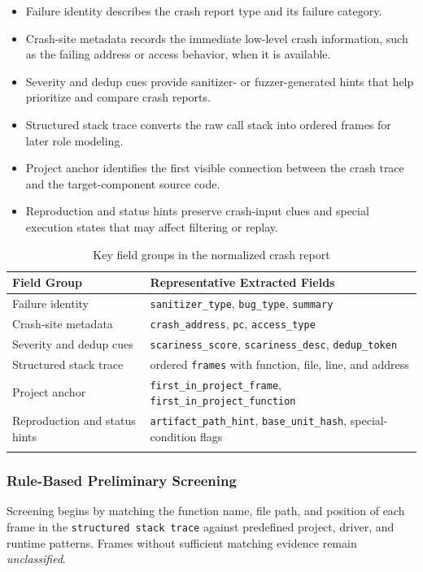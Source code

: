 \documentclass[pdflatex,sn-basic]{sn-jnl}%
\renewcommand{\arraystretch}{1.16}%
\newcommand{\compacttable}{\scriptsize\setlength{\tabcolsep}{2.2pt}\renewcommand{\arraystretch}{1.12}}%
\theoremstyle{thmstyleone}%
\theoremstyle{thmstyletwo}%
\theoremstyle{thmstylethree}%
\begin{document}
\begin{itemize}
    \item Failure identity describes the crash report type and its failure category.
    \item Crash-site metadata records the immediate low-level crash information, such as the failing address or access behavior, when it is available.
    \item Severity and dedup cues provide sanitizer- or fuzzer-generated hints that help prioritize and compare crash reports.
    \item Structured stack trace converts the raw call stack into ordered frames for later role modeling.
    \item Project anchor identifies the first visible connection between the crash trace and the target-component source code.
    \item Reproduction and status hints preserve crash-input clues and special execution states that may affect filtering or replay.
\end{itemize}

\begin{table}[t]
\caption{Key field groups in the normalized crash report}
\label{tab:sanitizer-normalized-fields}
\centering
\compacttable
\setlength{\tabcolsep}{4.0pt}
\renewcommand{\arraystretch}{1.10}
\begin{tabular*}{\linewidth}{@{\extracolsep{\fill}}ll}
\toprule
Field Group & Representative Extracted Fields \\
\midrule
Failure identity & \texttt{sanitizer\_type}, \texttt{bug\_type}, \texttt{summary} \\
Crash-site metadata & \texttt{crash\_address}, \texttt{pc}, \texttt{access\_type} \\
Severity and dedup cues & \texttt{scariness\_score}, \texttt{scariness\_desc}, \texttt{dedup\_token} \\
Structured stack trace & ordered \texttt{frames} with function, file, line, and address \\
Project anchor & \texttt{first\_in\_project\_frame}, \texttt{first\_in\_project\_function} \\
Reproduction and status hints & \texttt{artifact\_path\_hint}, \texttt{base\_unit\_hash}, special-condition flags \\
\botrule
\end{tabular*}
\end{table}
\FloatBarrier

\subsubsection{Rule-Based Preliminary Screening}
Screening begins by matching the function name, file path, and position of each frame in the \texttt{structured stack trace} against predefined project, driver, and runtime patterns.
Frames without sufficient matching evidence remain \emph{unclassified}.
\end{document}
